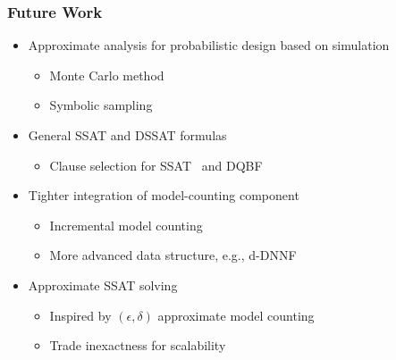 \begin{frame}
      \frametitle{Future Work}
      \begin{itemize}
            \item Approximate analysis for probabilistic design based on simulation
                  \pause
                  \begin{itemize}
                        \item Monte Carlo method
                              \pause
                        \item Symbolic sampling~\cite{KravetsDAC19ECOSampling}
                              \pause
                  \end{itemize}
            \item General SSAT and DSSAT formulas
                  \pause
                  \begin{itemize}
                        \item Clause selection for SSAT~\cite{Chen2021} and DQBF~\cite{Tentrup2019}
                              \pause
                  \end{itemize}
            \item Tighter integration of model-counting component
                  \pause
                  \begin{itemize}
                        \item Incremental model counting
                              \pause
                        \item More advanced data structure, e.g., d-DNNF~\cite{Darwiche2002dDNNF}
                              \pause
                  \end{itemize}
            \item Approximate SSAT solving
                  \pause
                  \begin{itemize}
                        \item Inspired by $(\epsilon,\delta)$ approximate model counting
                              \pause
                        \item Trade inexactness for scalability
                  \end{itemize}
      \end{itemize}
\end{frame}